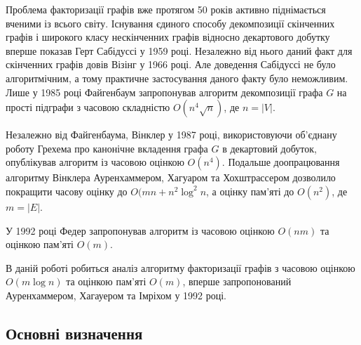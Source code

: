 Проблема факторизації графів вже протягом 50 років активно піднімається вченими із всього світу.
Існування єдиного способу декомпозиції скінченних графів і широкого класу нескінченних графів відносно декартового добутку вперше показав Герт Сабідуссі у 1959 році\cite{sabidussi59}.
Незалежно від нього даний факт для скінченних графів довів Візінг у 1966 році.
Але доведення Сабідуссі не було алгоритмічним, а тому практичне застосування даного факту було неможливим.
Лише у 1985 році Файгенбаум запропонував алгоритм декомпозиції графа $G$ на прості підграфи з часовою складністю $O(n^4\sqrt n)$, де $n=\vert V \vert$.

Незалежно від Файгенбаума, Вінклер у 1987 році, використовуючи об'єднану роботу Грехема про канонічне вкладення графа $G$ в декартовий добуток, опублікував алгоритм із часовою оцінкою $O(n^4)$.
Подальше доопрацювання алгоритму Вінклера Ауренхаммером, Хагуаром та Хох\-штрассером дозволило покращити часову оцінку до $O(mn+n^2\log^2n$, а оцінку пам'яті до $O(n^2)$, де $m=\vert E \vert$.

У 1992 році Федер запропонував алгоритм із часовою оцінкою $O(nm)$ та оцінкою пам'яті $O(m)$.

В даній роботі робиться аналіз алгоритму факторизації графів з часовою оцінкою $O(m\log n)$ та оцінкою пам'яті $O(m)$, вперше запропонований Ауренхаммером, Хагауером та Імріхом у 1992 році\cite{aurenhammer92}.

\newpage
\subsection{Основні визначення}

